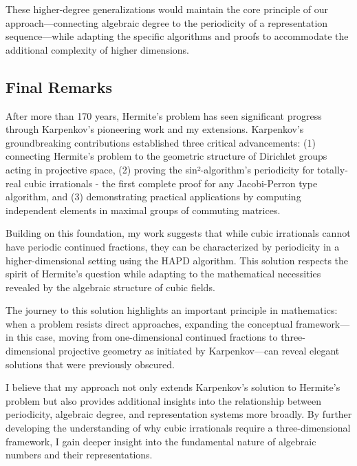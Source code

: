 These higher-degree generalizations would maintain the core principle of our approach—connecting algebraic degree to the periodicity of a representation sequence—while adapting the specific algorithms and proofs to accommodate the additional complexity of higher dimensions.

\subsection{Final Remarks}

After more than 170 years, Hermite's problem has seen significant progress through Karpenkov's pioneering work and my extensions. Karpenkov's groundbreaking contributions established three critical advancements: (1) connecting Hermite's problem to the geometric structure of Dirichlet groups acting in projective space, (2) proving the sin²-algorithm's periodicity for totally-real cubic irrationals - the first complete proof for any Jacobi-Perron type algorithm, and (3) demonstrating practical applications by computing independent elements in maximal groups of commuting matrices.

Building on this foundation, my work suggests that while cubic irrationals cannot have periodic continued fractions, they can be characterized by periodicity in a higher-dimensional setting using the HAPD algorithm. This solution respects the spirit of Hermite's question while adapting to the mathematical necessities revealed by the algebraic structure of cubic fields.

The journey to this solution highlights an important principle in mathematics: when a problem resists direct approaches, expanding the conceptual framework—in this case, moving from one-dimensional continued fractions to three-dimensional projective geometry as initiated by Karpenkov—can reveal elegant solutions that were previously obscured.

I believe that my approach not only extends Karpenkov's solution to Hermite's problem but also provides additional insights into the relationship between periodicity, algebraic degree, and representation systems more broadly. By further developing the understanding of why cubic irrationals require a three-dimensional framework, I gain deeper insight into the fundamental nature of algebraic numbers and their representations.
